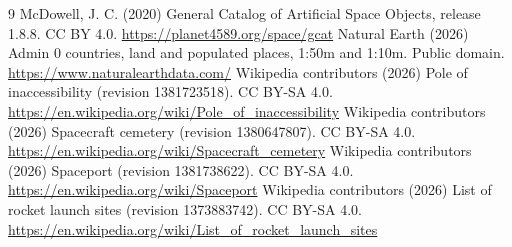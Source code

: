 \documentclass[11pt,a4paper]{article}
\begin{document}
\begin{thebibliography}{9}
 McDowell, J. C. (2020) General Catalog of Artificial Space Objects, release 1.8.8. CC BY 4.0. \url{https://planet4589.org/space/gcat}
 Natural Earth (2026) Admin 0 countries, land and populated places, 1:50m and 1:10m. Public domain. \url{https://www.naturalearthdata.com/}
 Wikipedia contributors (2026) Pole of inaccessibility (revision 1381723518). CC BY-SA 4.0. \url{https://en.wikipedia.org/wiki/Pole_of_inaccessibility}
 Wikipedia contributors (2026) Spacecraft cemetery (revision 1380647807). CC BY-SA 4.0. \url{https://en.wikipedia.org/wiki/Spacecraft_cemetery}
 Wikipedia contributors (2026) Spaceport (revision 1381738622). CC BY-SA 4.0. \url{https://en.wikipedia.org/wiki/Spaceport}
 Wikipedia contributors (2026) List of rocket launch sites (revision 1373883742). CC BY-SA 4.0. \url{https://en.wikipedia.org/wiki/List_of_rocket_launch_sites}
\end{thebibliography}
\end{document}
